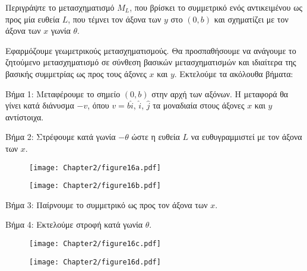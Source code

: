 
\begin{example}
Περιγράψτε το μετασχηματισμό $M_L$, που βρίσκει το συμμετρικό ενός αντικειμένου ως προς μία ευθεία $L$, που τέμνει τον άξονα των $y$ στο $(0,b)$ και σχηματίζει με τον άξονα των $x$ γωνία $\theta$.
\end{example}
\begin{solution}



Εφαρμόζουμε γεωμετρικούς μετασχηματισμούς. Θα προσπαθήσουμε να ανάγουμε το ζητούμενο μετασχηματισμό σε σύνθεση βασικών μετασχηματισμών και ιδιαίτερα της βασικής συμμετρίας ως προς τους άξονες $x$ και $y$. Εκτελούμε τα ακόλουθα βήματα:


Βήμα 1:  Μεταφέρουμε το σημείο $(0, b)$ στην αρχή των αξόνων. Η μεταφορά θα γίνει κατά διάνυσμα $-v$, όπου $v = b\hat{i}$, $\hat{i}$, $\hat{j}$ τα μοναδιαία στους άξονες $x$ και $y$ αντίστοιχα.

Βήμα 2: Στρέφουμε κατά γωνία $-\theta$ ώστε η ευθεία $L$ να ευθυγραμμιστεί με τον άξονα των $x$.

\begin{figure}[h!]
	\begin{center}
		\begin{minipage}[b]{0.48\textwidth} %
		    \texttt{[image: Chapter2/figure16a.pdf]}
		\end{minipage}%
	\hfill
		\begin{minipage}[b]{0.48\textwidth} %
			    \texttt{[image: Chapter2/figure16b.pdf]}
		\end{minipage}
	\end{center}
\end{figure}


Βήμα 3: Παίρνουμε το συμμετρικό ως προς τον άξονα των $x$.

Βήμα 4: Εκτελούμε στροφή κατά γωνία $\theta$.


\begin{figure}[h!]
	\begin{center}
		\begin{minipage}[b]{0.48\textwidth} %
		    \texttt{[image: Chapter2/figure16c.pdf]}
		\end{minipage}%
	\hfill
		\begin{minipage}[b]{0.48\textwidth} %
			    \texttt{[image: Chapter2/figure16d.pdf]}
		\end{minipage}
	\end{center}
\end{figure}



\end{solution}
